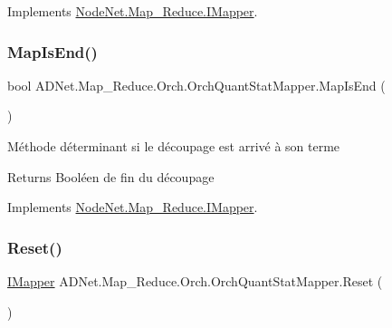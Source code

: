 Implements \hyperlink{interface_node_net_1_1_map___reduce_1_1_i_mapper_ac25758a2753bdfdc9579d29b9a31fe73}{Node\+Net.\+Map\+\_\+\+Reduce.\+I\+Mapper}.

\mbox{\label{class_a_d_net_1_1_map___reduce_1_1_orch_1_1_orch_quant_stat_mapper_a89d51140c9afd79b450619a41974d0b0}} 
\subsubsection{\texorpdfstring{Map\+Is\+End()}{MapIsEnd()}}
{\footnotesize\ttfamily bool A\+D\+Net.\+Map\+\_\+\+Reduce.\+Orch.\+Orch\+Quant\+Stat\+Mapper.\+Map\+Is\+End (\begin{DoxyParamCaption}{ }\end{DoxyParamCaption})}



Méthode déterminant si le découpage est arrivé à son terme 

\begin{DoxyReturn}{Returns}
Booléen de fin du découpage
\end{DoxyReturn}


Implements \hyperlink{interface_node_net_1_1_map___reduce_1_1_i_mapper_a0d6d2bd1a8081efa0d6df109af9c4ec1}{Node\+Net.\+Map\+\_\+\+Reduce.\+I\+Mapper}.

\mbox{\label{class_a_d_net_1_1_map___reduce_1_1_orch_1_1_orch_quant_stat_mapper_a374ab1b409195fbaeb104755028f2876}} 
\subsubsection{\texorpdfstring{Reset()}{Reset()}}
{\footnotesize\ttfamily \hyperlink{interface_node_net_1_1_map___reduce_1_1_i_mapper}{I\+Mapper} A\+D\+Net.\+Map\+\_\+\+Reduce.\+Orch.\+Orch\+Quant\+Stat\+Mapper.\+Reset (\begin{DoxyParamCaption}{ }\end{DoxyParamCaption})}



